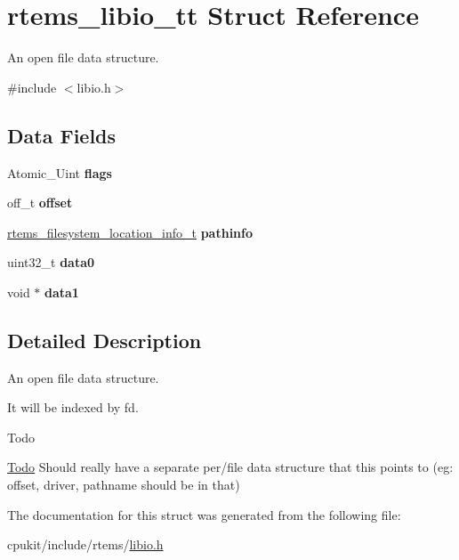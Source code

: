 \hypertarget{structrtems__libio__tt}{}\section{rtems\+\_\+libio\+\_\+tt Struct Reference}
\label{structrtems__libio__tt}


An open file data structure.  




{\ttfamily \#include $<$libio.\+h$>$}

\subsection*{Data Fields}
\begin{DoxyCompactItemize}
\item 
\mbox{\label{structrtems__libio__tt_a2eedd99792ae84bf08062b2168a82c91}} 
Atomic\+\_\+\+Uint {\bfseries flags}
\item 
\mbox{\label{structrtems__libio__tt_a5db133259277712e97c1e4103774eb28}} 
off\+\_\+t {\bfseries offset}
\item 
\mbox{\label{structrtems__libio__tt_a4fc6dcd4504d131b5cc3583964216d38}} 
\mbox{\hyperlink{group__LibIO_ga3252b3d31ee3c49ffff0b7604a676864}{rtems\+\_\+filesystem\+\_\+location\+\_\+info\+\_\+t}} {\bfseries pathinfo}
\item 
\mbox{\label{structrtems__libio__tt_a067943f65f27f1170396a40e5c803616}} 
uint32\+\_\+t {\bfseries data0}
\item 
\mbox{\label{structrtems__libio__tt_a5a3c84ee7ddbac2e5b02f47acc0024cd}} 
void $\ast$ {\bfseries data1}
\end{DoxyCompactItemize}


\subsection{Detailed Description}
An open file data structure. 

It will be indexed by \textquotesingle{}fd\textquotesingle{}.

\begin{DoxyRefDesc}{Todo}
\item[\mbox{\hyperlink{todo__todo000001}{Todo}}]Should really have a separate per/file data structure that this points to (eg\+: offset, driver, pathname should be in that) \end{DoxyRefDesc}


The documentation for this struct was generated from the following file\+:\begin{DoxyCompactItemize}
\item 
cpukit/include/rtems/\mbox{\hyperlink{libio_8h}{libio.\+h}}\end{DoxyCompactItemize}
